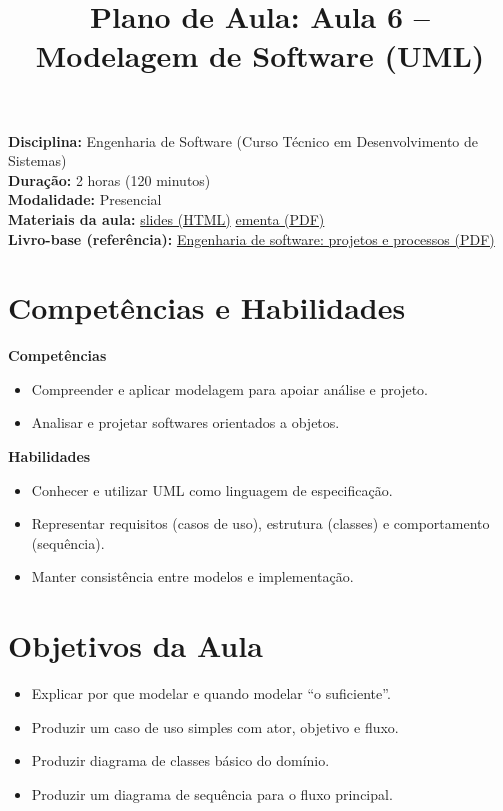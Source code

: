 \documentclass[12pt,a4paper]{article}
\title{Plano de Aula: Aula 6 -- Modelagem de Software (UML)}
\date{}
\begin{document}
\maketitle

\noindent
\textbf{Disciplina:} Engenharia de Software (Curso Técnico em Desenvolvimento de Sistemas)\\
\textbf{Duração:} 2 horas (120 minutos)\\
\textbf{Modalidade:} Presencial\\
\textbf{Materiais da aula:} \href{aula-06.html}{slides (HTML)} \quad \href{aula-06.pdf}{ementa (PDF)}\\
\textbf{Livro-base (referência):} \href{../99-Materiais/Engenharia%20de%20software%20projetos%20e%20processos%20by%20Wilson%20de%20P%C3%A1dua%20Paula%20Filho%20.epub.pdf}{Engenharia de software: projetos e processos (PDF)}

\section{Competências e Habilidades}
\textbf{Competências}
\begin{itemize}[leftmargin=*,itemsep=0.25em]
  \item Compreender e aplicar modelagem para apoiar análise e projeto.
  \item Analisar e projetar softwares orientados a objetos.
\end{itemize}

\textbf{Habilidades}
\begin{itemize}[leftmargin=*,itemsep=0.25em]
  \item Conhecer e utilizar UML como linguagem de especificação.
  \item Representar requisitos (casos de uso), estrutura (classes) e comportamento (sequência).
  \item Manter consistência entre modelos e implementação.
\end{itemize}

\section{Objetivos da Aula}
\begin{itemize}[leftmargin=*,itemsep=0.25em]
  \item Explicar por que modelar e quando modelar ``o suficiente''.
  \item Produzir um caso de uso simples com ator, objetivo e fluxo.
  \item Produzir diagrama de classes básico do domínio.
  \item Produzir um diagrama de sequência para o fluxo principal.
\end{itemize}
\end{document}
